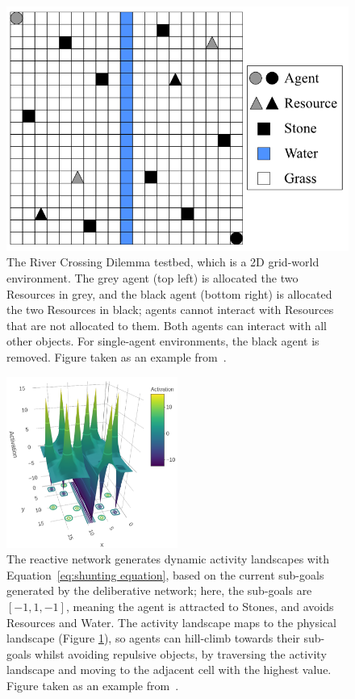 		\begin{figure}
    	\centering
    	\includegraphics[width=0.75\linewidth]{figures/rcd.png}
    	\caption[The River Crossing Dilemma testbed -- a 2D grid-world environment with a river of Water that agents must cross to retrieve their reward object (Resource).]{The River Crossing Dilemma testbed, which is a 2D grid-world environment. The grey agent (top left) is allocated the two Resources in grey, and the black agent (bottom right) is allocated the two Resources in black; agents cannot interact with Resources that are not allocated to them. Both agents can interact with all other objects. For single-agent environments, the black agent is removed. Figure taken as an example from~\citep{Barnes2021thesis}.}
    	\label{fig: rcd}
	\end{figure}

\lipsum[1]
 
    \begin{figure}
      \centering
      \includegraphics[width=0.5\textwidth]{figures/landscape.png}
      \caption[The reactive network, which generates dynamic activity landscapes that agents use to hill-climb towards their current sub-goals.]{The reactive network generates dynamic activity landscapes with Equation~\ref{eq:shunting equation}, based on the current sub-goals generated by the deliberative network; here, the sub-goals are $[-1,1,-1]$, meaning the agent is attracted to Stones, and avoids Resources and Water. The activity landscape maps to the physical landscape (Figure \ref{fig: rcd}), so agents can hill-climb towards their sub-goals whilst avoiding repulsive objects, by traversing the activity landscape and moving to the adjacent cell with the highest value. Figure taken as an example from~\citep{Barnes2021thesis}.}
      \label{fig: activation landscape}
   \end{figure}
	 

